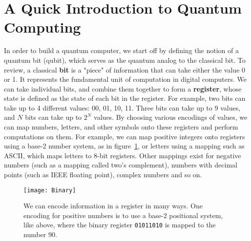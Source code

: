 \section{A Quick Introduction to Quantum Computing}
\label{sec:qc}
In order to build a quantum computer, we start off by defining the notion of a quantum bit (qubit), which
serves as the quantum analog to the classical bit. To review, a classical \textbf{bit} is a "piece" of information
that can take either the value 0 or 1. It represents the fundamental unit of computation in digital computers.
We can take individual bits, and combine them together to form a \textbf{register}, whose state is defined as 
the state of each bit in the register. For example, two bits can take up to 4 different
values: 00, 01, 10, 11. Three bits can take up to 9 values, and $N$ bits can take up to $2^N$ values. 
By choosing various encodings of values, we can map numbers, letters, and other symbols onto these registers
and perform computations on them. For example, we can map positive integers onto registers using a base-2 number 
system, as in figure~\ref{fig:binary}, or letters using a mapping such as ASCII, which maps letters to 8-bit registers.
Other mappings exist for negative numbers (such as a mapping called two's complement), numbers with
decimal points (such as IEEE floating point), complex numbers and so on. 

\begin{figure}
  \texttt{[image: Binary]}
  \caption[Binary Coding]
  {We can encode information in a register in many ways. One encoding for positive numbers is to use a base-2
  positional system, like above, where the binary register \texttt{01011010} is mapped to the number 90.}
  \label{fig:binary}
\end{figure}

